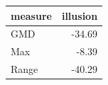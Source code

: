 \begin{tabular}{lr}
\toprule
measure & illusion \\
\midrule
GMD & -34.69 \\
Max & -8.39 \\
Range & -40.29 \\
\bottomrule
\end{tabular}
